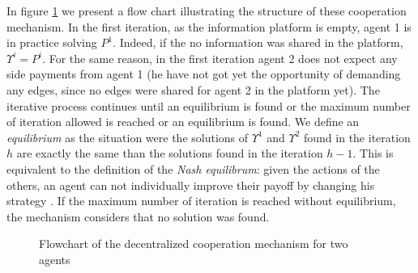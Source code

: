 \documentclass[review]{elsarticle}
\begin{document}
In figure \ref{fig:iterflowchart} we present a flow chart illustrating the structure of these cooperation mechanism.
In the first iteration, as the information platform is empty, agent 1 is in practice solving $P^1$. Indeed, if the no information was shared in the platform, $\Upsilon^i=P^i$. For the same reason, in the first iteration agent 2 does not expect any side payments from agent 1 (he have not got yet the opportunity of demanding any edges, since no edges were shared for agent 2 in the platform yet). The iterative process continues until an equilibrium is found or the maximum number of iteration allowed is reached or an equilibrium is found. We define an \emph{equilibrium} as the situation were the solutions of $\Upsilon^1$ and $\Upsilon^2$ found in the iteration $h$ are exactly the same than the solutions found in the iteration $h-1$. This is equivalent to the definition of the \emph{Nash equilibrum}: given the actions of the others, an agent can not individually improve their payoff by changing his strategy \citep{GONZALEZ2010}. If the maximum number of iteration is reached without equilibrium, the mechanism considers that no solution was found.


\begin{figure}[ht!]
\centering
\caption{Flowchart of the decentralized cooperation mechanism for two agents\label{fig:iterflowchart}}
\end{figure}
\end{document}
